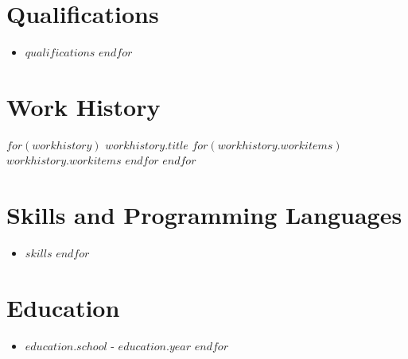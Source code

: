 \documentclass{res}
\begin{document}
\section{Qualifications}
\begin{itemize}
\setlength\itemsep{-0.5em}
$for(qualifications)$
\item\normalsize $qualifications$
$endfor$
\end{itemize}
\section{Work History}
$for(workhistory)$
\textit{$workhistory.title$}
\workitems
$for(workhistory.workitems)$
{$workhistory.workitems$}
$endfor$
$endfor$
\section{Skills and Programming Languages}
\begin{itemize}
\setlength\itemsep{-0.5em}
$for(skills)$
\item\normalsize $skills$
$endfor$
\end{itemize}
\section{Education}
\begin{itemize}
\setlength\itemsep{-0.5em}
$for(education)$
\item\normalsize{$education.school$} - \normalsize{$education.year$}
$endfor$
\end{itemize}
\end{document}
